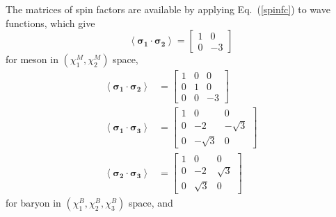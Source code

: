 \documentclass[prd,twocolumn,floatfix,nofootinbib]{revtex4}
\begin{document}
The matrices of spin factors are available by applying Eq.~(\ref{spinfc}) to wave functions, which give
\begin{equation}\label{sfcM}
    \left\langle \boldsymbol{\sigma_{1}}\cdot \boldsymbol{\sigma_{2}} \right\rangle=
    \begin{bmatrix}
        1 & 0 \\
        0 & -3
    \end{bmatrix}
\end{equation}
for meson in $(\chi_{1}^{M},\chi_{2}^{M})$ space,
    \begin{align}
        \left\langle \boldsymbol{\sigma_{1}}\cdot \boldsymbol{\sigma_{2}} \right\rangle&=
        \begin{bmatrix}
            1 & 0 & 0 \\
            0 & 1 & 0 \\
            0 & 0 & -3
        \end{bmatrix} \\ 
        \left\langle \boldsymbol{\sigma_{1}}\cdot \boldsymbol{\sigma_{3}} \right\rangle&=
        \begin{bmatrix}
            1 & 0 & 0 \\
            0 & -2 & -\sqrt{3} \\
            0 & -\sqrt{3} & 0
        \end{bmatrix} \\ 
        \left\langle \boldsymbol{\sigma_{2}}\cdot \boldsymbol{\sigma_{3}} \right\rangle&=
        \begin{bmatrix}
            1 & 0 & 0 \\
            0 & -2 & \sqrt{3} \\
            0 & \sqrt{3} & 0
        \end{bmatrix}
    \end{align}
for baryon in $(\chi_{1}^{B},\chi_{2}^{B},\chi_{3}^{B})$ space, and 
\end{document}
